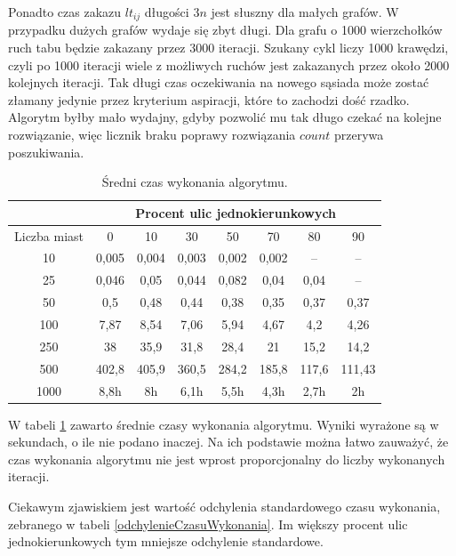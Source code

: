 \documentclass[11pt,a4paper,twoside]{article}
\begin{document}
Ponadto czas zakazu $lt_{ij}$ długości $3n$ jest słuszny dla małych grafów. W przypadku dużych grafów wydaje się zbyt długi. Dla grafu o 1000 wierzchołków ruch tabu będzie zakazany przez 3000 iteracji. Szukany cykl liczy 1000 krawędzi, czyli po 1000 iteracji wiele z możliwych ruchów jest zakazanych przez około 2000 kolejnych iteracji. Tak długi czas oczekiwania na nowego sąsiada może zostać złamany jedynie przez kryterium aspiracji, które to zachodzi dość rzadko. Algorytm byłby mało wydajny, gdyby pozwolić mu tak długo czekać na kolejne rozwiązanie, więc licznik braku poprawy rozwiązania $count$ przerywa poszukiwania.

\bgroup
\def\arraystretch{1.2}
\begin{table}[ht]
\centering
\begin{tabular}{|c|c|c|c|c|c|c|c|}
\hline
 & \multicolumn{7}{c|}{Procent ulic jednokierunkowych}\\\hline
Liczba miast & 0 & 10 & 30 & 50 & 70& 80& 90\\  \hline
10& 0,005& 0,004& 0,003& 0,002& 0,002& --& --\\ \hline
25& 0,046& 0,05& 0,044& 0,082& 0,04& 0,04& --\\ \hline
50& 0,5& 0,48& 0,44& 0,38& 0,35& 0,37& 0,37\\ \hline
100& 7,87& 8,54& 7,06& 5,94& 4,67& 4,2& 4,26\\ \hline
250& 38& 35,9&31,8& 28,4& 21& 15,2& 14,2 \\ \hline
500& 402,8& 405,9& 360,5& 284,2& 185,8& 117,6& 111,43\\ \hline
1000& 8,8h& 8h& 6,1h& 5,5h& 4,3h& 2,7h& 2h\\ \hline
\end{tabular}
\caption{Średni czas wykonania algorytmu.}
\label{czasWykonania}
\end{table}
\egroup

W tabeli \ref{czasWykonania} zawarto średnie czasy wykonania algorytmu. Wyniki wyrażone są w sekundach, o ile nie podano inaczej. Na ich podstawie można łatwo zauważyć, że czas wykonania algorytmu nie jest wprost proporcjonalny do liczby wykonanych iteracji. 

Ciekawym zjawiskiem jest wartość odchylenia standardowego czasu wykonania, zebranego w tabeli \ref{odchylenieCzasuWykonania}. Im większy procent ulic jednokierunkowych tym mniejsze odchylenie standardowe.
\end{document}
